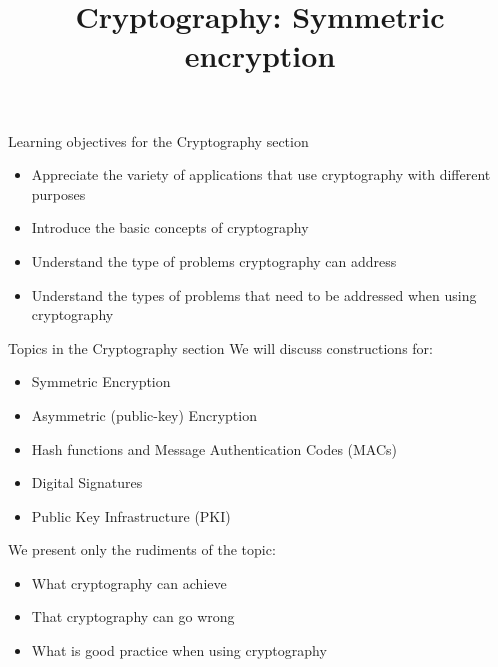 \documentclass[aspectratio=169, lualatex, handout, 10pt,dvipsnames,svgnames]{beamer} %
\begin{document}
\begin{frame}{Learning objectives for the Cryptography section}

  \begin{itemize}
  \item Appreciate the variety of applications that use cryptography with different purposes
    \bigskip{}
    
  \item Introduce the basic concepts of cryptography
    \bigskip{}
    
    
  \item Understand the type of problems cryptography can address
    \bigskip{}
    
  \item Understand the types of problems that need to be addressed when using cryptography
    
  \end{itemize}

\end{frame}

\begin{frame}{Topics in the Cryptography section}
  We will discuss constructions for:
  \begin{itemize}
  \item Symmetric Encryption
  \item Asymmetric (public-key) Encryption
  \item Hash functions and Message Authentication Codes (MACs)
  \item Digital Signatures
  \item Public Key Infrastructure (PKI)
  \end{itemize}
  \bigskip
  \bigskip
  
  \begin{block}{We present only the rudiments of the topic:}
    \begin{itemize}
    \item What cryptography can achieve
    \item That cryptography can go wrong
    \item What is good practice when using cryptography
    \end{itemize}
  \end{block}
  
\end{frame}

\title{Cryptography: Symmetric encryption}
\author{}
\date{}

\begin{frame}
  \titlepage
\end{frame}
\end{document}
